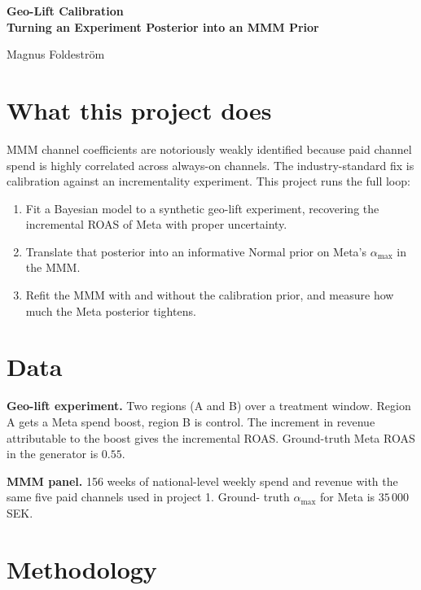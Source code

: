 \documentclass[a4paper,11pt]{article}
\begin{document}
\begin{titlepage}
\thispagestyle{empty}
\centering
\vspace*{3cm}
{\Huge\bfseries Geo-Lift Calibration\\\bigskip
\LARGE Turning an Experiment Posterior into an MMM Prior
\par}
\vspace{1.5cm}
{\Large Magnus Foldeström\par}
\vfill
\end{titlepage}

\section{What this project does}

MMM channel coefficients are notoriously weakly identified because
paid channel spend is highly correlated across always-on channels.
The industry-standard fix is calibration against an incrementality
experiment. This project runs the full loop:

\begin{enumerate}
\item Fit a Bayesian model to a synthetic geo-lift experiment,
recovering the incremental ROAS of Meta with proper uncertainty.
\item Translate that posterior into an informative Normal prior on
Meta's $\alpha_{\max}$ in the MMM.
\item Refit the MMM with and without the calibration prior, and
measure how much the Meta posterior tightens.
\end{enumerate}

\section{Data}

\textbf{Geo-lift experiment.} Two regions (A and B) over a treatment
window. Region A gets a Meta spend boost, region B is control. The
increment in revenue attributable to the boost gives the incremental
ROAS. Ground-truth Meta ROAS in the generator is $0.55$.

\textbf{MMM panel.} 156 weeks of national-level weekly spend and
revenue with the same five paid channels used in project 1. Ground-
truth $\alpha_{\max}$ for Meta is $35\,000$ SEK.

\section{Methodology}
\end{document}
